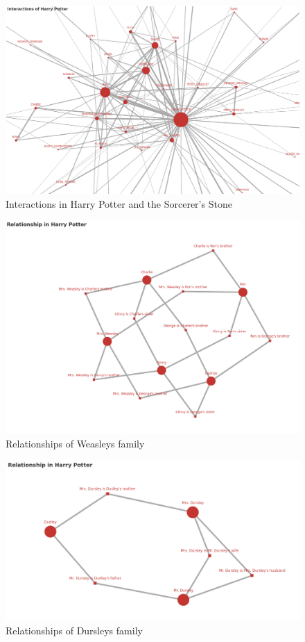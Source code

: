 \documentclass[11pt]{article}
\begin{document}
    \begin{figure}[H]
        \centering
        \includegraphics[width=\linewidth]{images/int_hp.png}
        \caption{Interactions in Harry Potter and the Sorcerer's Stone}
    \end{figure}
    \begin{figure}[H]
        \centering
        \includegraphics[width=\linewidth]{images/hp1_1.png}
        \caption{Relationships of Weasleys family}
    \end{figure}
    \begin{figure}[H]
        \centering
        \includegraphics[width=\linewidth]{images/hp1_2.png}
        \caption{Relationships of Dursleys family}
    \end{figure}
\end{document}
